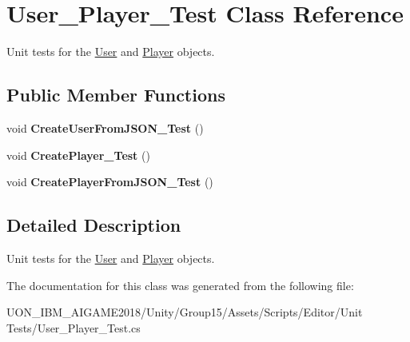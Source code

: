 \hypertarget{class_user___player___test}{}\section{User\+\_\+\+Player\+\_\+\+Test Class Reference}
\label{class_user___player___test}


Unit tests for the \mbox{\hyperlink{class_user}{User}} and \mbox{\hyperlink{class_player}{Player}} objects.  


\subsection*{Public Member Functions}
\begin{DoxyCompactItemize}
\item 
\mbox{\label{class_user___player___test_a45e8193156cae6d3615b54d257738662}} 
void {\bfseries Create\+User\+From\+J\+S\+O\+N\+\_\+\+Test} ()
\item 
\mbox{\label{class_user___player___test_aa88269b78c5bd7f6140b20b14aa975a0}} 
void {\bfseries Create\+Player\+\_\+\+Test} ()
\item 
\mbox{\label{class_user___player___test_a1b00d27b0e5bb67f63d0ee46ed39b0f0}} 
void {\bfseries Create\+Player\+From\+J\+S\+O\+N\+\_\+\+Test} ()
\end{DoxyCompactItemize}


\subsection{Detailed Description}
Unit tests for the \mbox{\hyperlink{class_user}{User}} and \mbox{\hyperlink{class_player}{Player}} objects. 

The documentation for this class was generated from the following file\+:\begin{DoxyCompactItemize}
\item 
U\+O\+N\+\_\+\+I\+B\+M\+\_\+\+A\+I\+G\+A\+M\+E2018/\+Unity/\+Group15/\+Assets/\+Scripts/\+Editor/\+Unit Tests/User\+\_\+\+Player\+\_\+\+Test.\+cs\end{DoxyCompactItemize}
